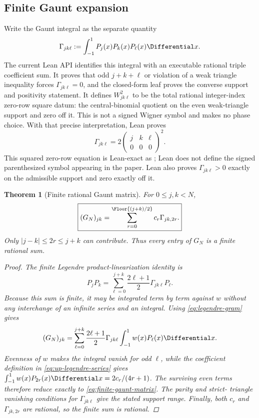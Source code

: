 \documentclass[11pt,oneside]{article}
\newtheorem{theorem}{Theorem}[section]
\theoremstyle{definition}
\theoremstyle{remark}
\numberwithin{equation}{section}
\begin{document}
\subsection{Finite Gaunt expansion}
Write the Gaunt integral as the separate quantity
\begin{equation}
 \Gamma_{jk\ell}:=
 \int_{-1}^{1}P_j(x)P_k(x)P_\ell(x)\Differential x
 {}.
 \label{eq:gaunt-integral}
\end{equation}
The current Lean API identifies this integral with an executable rational triple
coefficient sum.  It proves that odd $j+k+\ell$ or violation of a weak triangle
inequality forces $\Gamma_{jk\ell}=0$, and the closed-form leaf proves the converse
support and positivity statement.  It defines \(W^2_{jk\ell}\) to be the total
rational integer-index zero-row square datum: the central-binomial quotient on the
even weak-triangle support and zero off it.  This is not a signed Wigner symbol and
makes no phase choice.  With that precise interpretation, Lean proves
\begin{equation}
 \Gamma_{jk\ell}
 =2\begin{pmatrix}j&k&\ell\\0&0&0\end{pmatrix}^{\!2}.
 \label{eq:gaunt-wigner}
\end{equation}
This squared zero-row equation is Lean-exact as
; Lean does not define the
signed parenthesized symbol appearing in the paper.  Lean also proves
\(\Gamma_{jk\ell}>0\) exactly on the admissible support and zero exactly off it.

\begin{theorem}[Finite rational Gaunt matrix]
\label{thm:finite-gaunt-matrix}
For $0\le j,k<N$,
\begin{equation}
 \boxed{
 (G_N)_{jk}=
 \sum_{r=0}^{\Floor{(j+k)/2}}c_r\Gamma_{jk,2r}.}
 \label{eq:finite-gaunt-matrix}
\end{equation}
Only $|j-k|\le2r\le j+k$ can contribute.  Thus every entry of $G_N$ is a finite
rational sum.
\begin{proof}
The finite Legendre product-linearization identity is
\[
 P_jP_k=
 \sum_{\ell=0}^{j+k}\frac{2\ell+1}{2}\Gamma_{jk\ell}P_\ell.
\]
Because this sum is finite, it may be integrated term by term against $w$ without
any interchange of an infinite series and an integral.  Using
\cref{eq:legendre-gram} gives
\[
 (G_N)_{jk}=
 \sum_{\ell=0}^{j+k}\frac{2\ell+1}{2}\Gamma_{jk\ell}
 \int_{-1}^{1}w(x)P_\ell(x)\Differential x.
\]
Evenness of $w$ makes the integral vanish for odd $\ell$, while the coefficient
definition in \cref{eq:up-legendre-series} gives
$\int_{-1}^{1}w(x)P_{2r}(x)\Differential x=2c_r/(4r+1)$.  The surviving even terms
therefore reduce exactly to \cref{eq:finite-gaunt-matrix}.  The parity and strict-
triangle vanishing conditions for $\Gamma_{jk\ell}$ give the stated support range.
Finally, both $c_r$ and $\Gamma_{jk,2r}$ are rational, so the finite sum is rational.
\end{proof}
\end{theorem}
\end{document}
